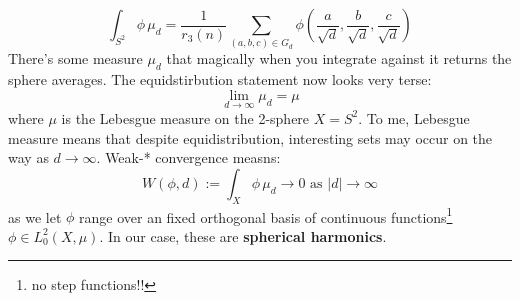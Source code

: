 \documentclass[12pt]{article}
\begin{document}
$$ \int_{S^2} \phi \, \mu_d = \frac{1}{r_3(n)} \sum_{(a,b,c) \in G_d} \phi \left( \frac{a}{\sqrt{d}},\frac{b}{\sqrt{d}},\frac{c}{\sqrt{d}} \right) $$
There's some measure $\mu_d$ that magically when you integrate against it returns the sphere averages.  The equidstirbution statement now looks very terse:
$$ \lim_{d \to \infty} \mu_d =  \mu $$
where $\mu$ is the Lebesgue measure on the 2-sphere $X = S^2$.  To me, Lebesgue measure means that despite equidistribution, interesting sets may occur on the way as $d \to \infty$.   Weak-* convergence measns:
$$W(\phi, d) := \int_X \phi \, \mu_d \to 0 \text{ as } |d| \to \infty $$
as we let $\phi$ range over an fixed orthogonal basis of continuous functions\footnote{no step functions!!} $\phi \in L_0^2(X, \mu)$.   In our case, these are \textbf{spherical harmonics}.

\newpage
\end{document}
